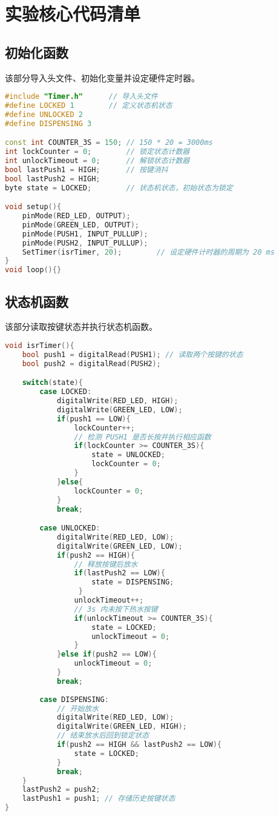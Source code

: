 \documentclass{article}
\begin{document}
\section{实验核心代码清单} 
\subsection{初始化函数}
该部分导入头文件、初始化变量并设定硬件定时器。
\begin{lstlisting}[language=c++]
#include "Timer.h"      // 导入头文件
#define LOCKED 1        // 定义状态机状态
#define UNLOCKED 2
#define DISPENSING 3

const int COUNTER_3S = 150; // 150 * 20 = 3000ms
int lockCounter = 0;        // 锁定状态计数器
int unlockTimeout = 0;      // 解锁状态计数器
bool lastPush1 = HIGH;      // 按键消抖
bool lastPush2 = HIGH;
byte state = LOCKED;        // 状态机状态，初始状态为锁定

void setup(){
    pinMode(RED_LED, OUTPUT);
    pinMode(GREEN_LED, OUTPUT);
    pinMode(PUSH1, INPUT_PULLUP);
    pinMode(PUSH2, INPUT_PULLUP);
    SetTimer(isrTimer, 20);        // 设定硬件计时器的周期为 20 ms
}
void loop(){}
\end{lstlisting}
\subsection{状态机函数}
该部分读取按键状态并执行状态机函数。
\begin{lstlisting}[language=c++]
void isrTimer(){
    bool push1 = digitalRead(PUSH1); // 读取两个按键的状态
    bool push2 = digitalRead(PUSH2);

    switch(state){
        case LOCKED:
            digitalWrite(RED_LED, HIGH);
            digitalWrite(GREEN_LED, LOW);
            if(push1 == LOW){
                lockCounter++;
                // 检测 PUSH1 是否长按并执行相应函数
                if(lockCounter >= COUNTER_3S){
                    state = UNLOCKED;
                    lockCounter = 0;
                }
            }else{
                lockCounter = 0;
            }
            break;

        case UNLOCKED:
            digitalWrite(RED_LED, LOW);
            digitalWrite(GREEN_LED, LOW);
            if(push2 == HIGH){
                // 释放按键后放水
                if(lastPush2 == LOW){            
                    state = DISPENSING;
                 }
                unlockTimeout++;
                // 3s 内未按下热水按键
                if(unlockTimeout >= COUNTER_3S){ 
                    state = LOCKED;
                    unlockTimeout = 0;
                }
            }else if(push2 == LOW){
                unlockTimeout = 0;
            }
            break;
            
        case DISPENSING:
            // 开始放水
            digitalWrite(RED_LED, LOW);
            digitalWrite(GREEN_LED, HIGH);          
            // 结束放水后回到锁定状态
            if(push2 == HIGH && lastPush2 == LOW){  
                state = LOCKED;
            }
            break;
    }
    lastPush2 = push2;
    lastPush1 = push1; // 存储历史按键状态
}
\end{lstlisting}
\end{document}

